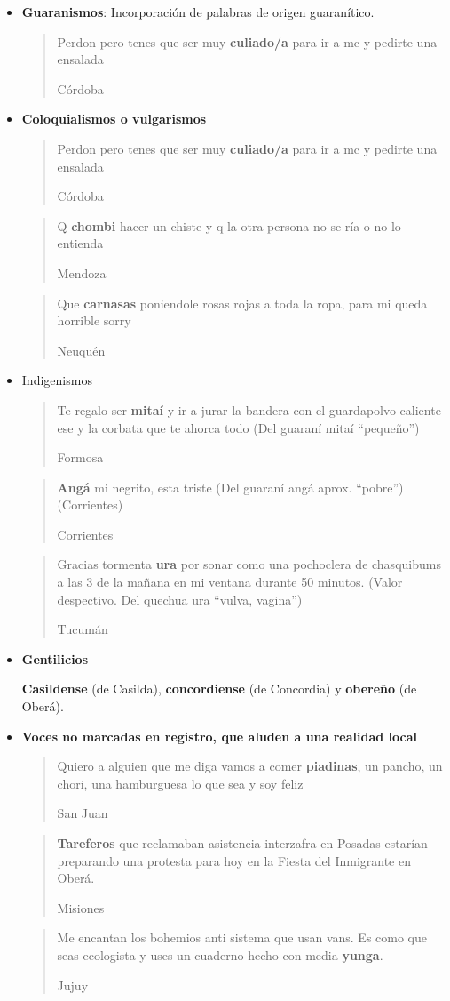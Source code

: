 \begin{itemize}
  
  \item \textbf{Guaranismos}: Incorporación de palabras de origen guaranítico.
  \label{it:caracterizacionLinguistica}
  \blockquote[Córdoba]{Perdon pero tenes que ser muy \textbf{culiado/a} para ir a mc y pedirte una ensalada}

  \item \textbf{Coloquialismos o vulgarismos}

    \blockquote[Córdoba]{Perdon pero tenes que ser muy \textbf{culiado/a} para ir a mc y pedirte una ensalada}


    \blockquote[Mendoza]{Q \textbf{chombi} hacer un chiste y q la otra persona no se ría o no lo entienda}

    \blockquote[Neuquén]{Que \textbf{carnasas} poniendole rosas rojas a toda la ropa, para mi queda horrible sorry}

\item Indigenismos

    \blockquote[Formosa]{Te regalo ser \textbf{mitaí} y ir a jurar la bandera con el guardapolvo caliente ese y la corbata que te ahorca todo (Del guaraní mitaí “pequeño”)}

    \blockquote[Corrientes]{\textbf{Angá} mi negrito, esta triste (Del guaraní angá aprox. “pobre”) (Corrientes)}

    \blockquote[Tucumán]{Gracias tormenta \textbf{ura} por sonar como una pochoclera de chasquibums a las 3 de la mañana en mi ventana durante 50 minutos. (Valor despectivo. Del quechua ura “vulva, vagina”) }

\item \textbf{Gentilicios}

  \textbf{Casildense} (de Casilda), \textbf{concordiense} (de Concordia) y \textbf{obereño} (de Oberá).

\item \textbf{Voces no marcadas en registro, que aluden a una realidad local}

  \blockquote[San Juan]{Quiero a alguien que me diga vamos a comer \textbf{piadinas}, un pancho, un chori, una hamburguesa lo que sea y soy feliz}

  \blockquote[Misiones]{\textbf{Tareferos} que reclamaban asistencia interzafra en Posadas estarían preparando una protesta para hoy en la Fiesta del Inmigrante en Oberá.}

  \blockquote[Jujuy]{Me encantan los bohemios anti sistema que usan vans. Es como que seas ecologista y uses un cuaderno hecho con media \textbf{yunga}.}


\end{itemize}
